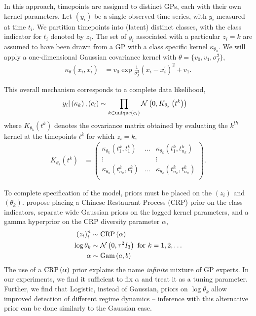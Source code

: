 \documentclass[14pt]{extreport}
\begin{document}
In this approach, timepoints are assigned to distinct GPs, each with their own
kernel parameters. Let $\left(y_{i}\right)$ be a single observed time series,
with $y_{i}$ measured at time $t_{i}$. We partition timepoints into (latent)
distinct classes, with the class indicator for $t_i$ denoted by $z_i$. The set
of $y_i$ associated with a particular $z_i = k$ are assumed to have been drawn
from a GP with a class specific kernel $\kappa_{\theta_k}$. We will apply a
one-dimensional Gaussian covariance kernel with $\theta = \{v_0, v_1, \sigma_f^2\}$,
\begin{align*}
  \kappa_\theta\left(x_i, x_i^\prime\right) &= v_0 \exp{\frac{1}{\sigma_f^2} \left(x_i - x_i^\prime\right)^2} + v_1.
\end{align*}

This overall mechanism corresponds to a complete data likelihood,
\begin{align*}
 y_i \vert \left(\kappa_k\right), \left(c_i\right) &\sim \prod_{k \in \text{unique}\left(c_i\right)} \mathcal{N}\left(0, K_{\theta_k}\left(t^k\right)\right)
\end{align*}
where $K_{\theta_k}\left(t^k\right)$ denotes the covariance matrix obtained by
evaluating the $k^{th}$ kernel at the timepoints $t^k$ for which $z_i = k$,
\begin{align*}
  K_{\theta_k}\left(t^k\right) &= \begin{pmatrix}
    \kappa_{\theta_k}\left(t^k_1, t^k_1\right) & \dots  & \kappa_{\theta_k}\left(t^k_1, t^k_{n_k}\right) \\
    \vdots & & \vdots \\
    \kappa_{\theta_k}\left(t^k_{n_k}, t^k_1\right) & \dots  & \kappa_{\theta_k}\left(t^k_{n_k}, t^k_{n_k}\right) \\
  \end{pmatrix}.
\end{align*}

To complete specification of the model, priors must be placed on the
$\left(z_i\right)$ and $\left(\theta_k\right)$. \citep{rasmussen2002infinite}
propose placing a Chinese Restaurant Process (CRP) prior on the class indicators,
separate wide Gaussian priors on the logged kernel parameters, and a gamma
hyperprior on the CRP diversity parameter $\alpha$,
\begin{align*}
  \left(z_i\right)_i^n &\sim \textnormal{CRP}\left(\alpha\right) \\
  \log \theta_k &\sim \mathcal{N}\left(0, \tau^2 I_3\right) \text{ for } k = 1, 2, \dots \\
  \alpha &\sim \textnormal{Gam}\left(a, b\right)
\end{align*}
The use of a $\textnormal{CRP}\left(\alpha\right)$ prior explains the name \textit{infinite}
mixture of GP experts. In our experiments, we find it sufficient to fix $\alpha$
and treat it as a tuning parameter. Further, we find that Logistic, instead of
Gaussian, priors on $\log \theta_k$ allow improved detection of different regime
dynamics -- inference with this alternative prior can be done similarly to the
Gaussian case.
\end{document}
